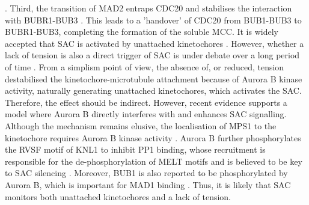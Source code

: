 \citep{Mapelli2007MADSignaling, Mapelli2007TheCheckpoint, DeAntoni2005TheCheckpoint}. Third, the transition of MAD2 entraps CDC20 and stabilises the interaction with BUBR1-BUB3 \citep{Piano2021CDC20Complex, Lara-Gonzalez2021AKinetochores, Fischer2022JuxtapositionAssembly, Alfieri2016MolecularCheckpoint}. This leads to a 'handover' of CDC20 from BUB1-BUB3 to BUBR1-BUB3, completing the formation of the soluble MCC. It is widely accepted that SAC is activated by unattached kinetochores \citep{London2014, Musacchio2011SpindleDecade, Lara-Gonzalez2021SpindleKinetochores, Musacchio2015TheDynamics}. However, whether a lack of tension is also a direct trigger of SAC is under debate over a long period of time \citep{McVey2021AuroraSegregation, McAinsh2023PrinciplesSignalling}. From a simplism point of view, the absence of, or reduced, tension destabilised the kinetochore-microtubule attachment because of Aurora B kinase activity, naturally generating unattached kinetochores, which activates the SAC. Therefore, the effect should be indirect. However, recent evidence supports a model where Aurora B directly interferes with and enhances SAC signalling. Although the mechanism remains elusive, the localisation of MPS1 to the kinetochore requires Aurora B kinase activity \citep{Ji2015KinetochoreNdc80C, Saurin2011AuroraMitosis, Nijenhuis2013AB}. Aurora B further phosphorylates the RVSF motif of KNL1 to inhibit PP1 binding, whose recruitment is responsible for the de-phosphorylation of MELT motifs and is believed to be key to SAC silencing \citep{Liu2010RegulatedKinase, Roy2019}. Moreover, BUB1 is also reported to be phosphorylated by Aurora B, which is important for MAD1 binding \citep{Roy2022AuroraSignaling}. Thus, it is likely that SAC monitors both unattached kinetochores and a lack of tension. 

